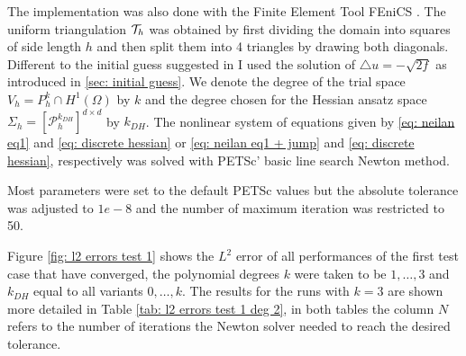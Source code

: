 The implementation was also done with the Finite Element Tool FEniCS \cite{FEniCS}. The uniform triangulation $\mathcal{T}_h$ was obtained by first dividing the domain into squares of side length $h$ and then split them into 4 triangles by drawing both diagonals. \\
Different to the initial guess suggested in \cite{Neilan2014} I used the solution of $\triangle u = -\sqrt{2f}$ as introduced in \ref{sec: initial guess}. 
We denote the degree of the trial space $V_h=P_h^k \cap H^1(\Omega)$ by $k$ and the degree chosen for the Hessian ansatz space $\Sigma_h = [\mathcal{P}_h^{k_{DH}}]^{d \times d}$ by $k_{DH}$. The nonlinear system of equations given by \eqref{eq: neilan eq1} and \eqref{eq: discrete hessian} or \eqref{eq: neilan eq1 + jump} and \eqref{eq: discrete hessian}, respectively was solved with PETSc' basic line search Newton method. 

Most parameters were set to the default PETSc values %
but the absolute tolerance was adjusted to $1e-8$ and the number of maximum iteration was restricted to 50. 

Figure \ref{fig: l2 errors test 1} shows the $L^2$ error of all performances of the first test case that have converged, the polynomial degrees $k$ were taken to be $1,\dots,3$ and $k_{DH}$ equal to all variants $0, \dots, k$.  The results for the runs with $k=3$ are shown more detailed in Table \ref{tab: l2 errors test 1 deg 2}, in both tables the column $N$ refers to the number of iterations the Newton solver needed to reach the desired tolerance. 

